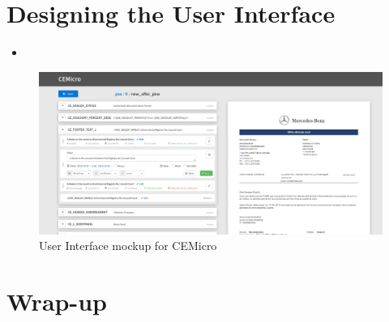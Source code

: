 

\section{Designing the User Interface}

\begin{itemize}
  \item {}
\end{itemize}

\begin{figure}
  \centering
  \includegraphics[width=\linewidth]{assets/cemicro-ui-mockup.png}
  \caption{User Interface mockup for CEMicro}
  \label{fig:mockup}
\end{figure}

\section{Wrap-up}


